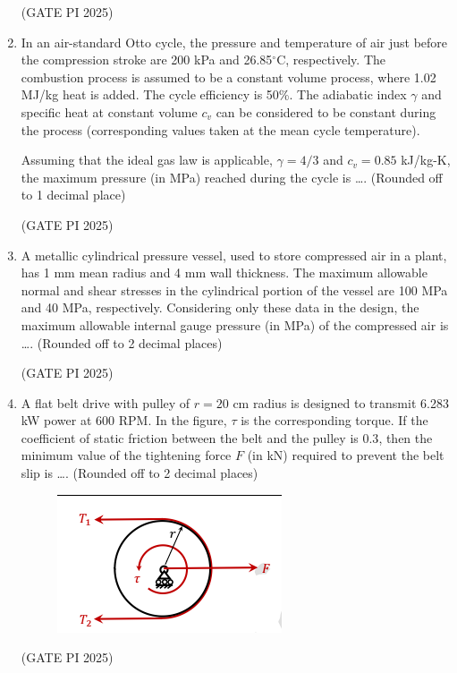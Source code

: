 \documentclass[journal,12pt,onecolumn]{IEEEtran}
\theoremstyle{remark}
\begin{document}
\begin{enumerate}
\hfill (GATE PI 2025)

\item In an air-standard Otto cycle, the pressure and temperature of air just before the compression stroke are 200 kPa and 26.85$^\circ$C, respectively. The combustion process is assumed to be a constant volume process, where 1.02 MJ/kg heat is added. The cycle efficiency is 50\%. The adiabatic index $\gamma$ and specific heat at constant volume $c_v$ can be considered to be constant during the process (corresponding values taken at the mean cycle temperature).

Assuming that the ideal gas law is applicable, $\gamma = 4/3$ and $c_v = 0.85$ kJ/kg-K, the maximum pressure (in MPa) reached during the cycle is \dots . (Rounded off to 1 decimal place)

\hfill (GATE PI 2025)

\item A metallic cylindrical pressure vessel, used to store compressed air in a plant, has 1 mm mean radius and 4 mm wall thickness. The maximum allowable normal and shear stresses in the cylindrical portion of the vessel are 100 MPa and 40 MPa, respectively. Considering only these data in the design, the maximum allowable internal gauge pressure (in MPa) of the compressed air is \dots . (Rounded off to 2 decimal places)

\hfill (GATE PI 2025)

\item A flat belt drive with pulley of $r = 20$ cm radius is designed to transmit 6.283 kW power at 600 RPM. In the figure, $\tau$ is the corresponding torque. If the coefficient of static friction between the belt and the pulley is $0.3$, then the minimum value of the tightening force $F$ (in kN) required to prevent the belt slip is \dots . (Rounded off to 2 decimal places)

\begin{figure}[H]
\centering
\includegraphics[width=0.5\columnwidth]{fig10.png}
\caption{}
\end{figure}

\hfill (GATE PI 2025)


\end{enumerate}
\end{document}
